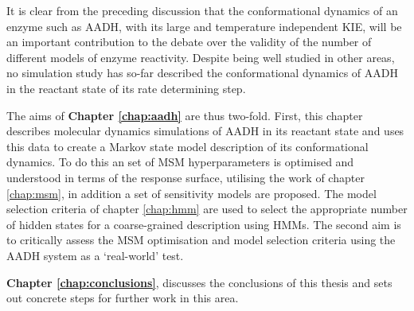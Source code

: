 It is clear from the preceding discussion that the conformational dynamics of an enzyme such as AADH, with its large and temperature independent KIE, will be an important contribution to the debate over the validity of the number of different models of enzyme reactivity. Despite being well studied in other areas, no simulation study has so-far described the conformational dynamics of AADH in the reactant state of its rate determining step.  

The aims of \textbf{Chapter \ref{chap:aadh}} are thus two-fold.  First, this chapter describes molecular dynamics simulations of AADH in its reactant state and uses this data to create a Markov state model description of its conformational dynamics. To do this an  set of MSM hyperparameters is optimised and understood in terms of the response surface, utilising the work of chapter \ref{chap:msm}, in addition a set of sensitivity models are proposed. The model selection criteria of chapter \ref{chap:hmm} are used to select the appropriate number of hidden states for a coarse-grained description using HMMs. The second aim is to critically assess the MSM optimisation and model selection criteria  using the AADH system as a `real-world' test.

\textbf{Chapter \ref{chap:conclusions}}, discusses the conclusions of this thesis and sets out concrete steps for further work in this area. 















